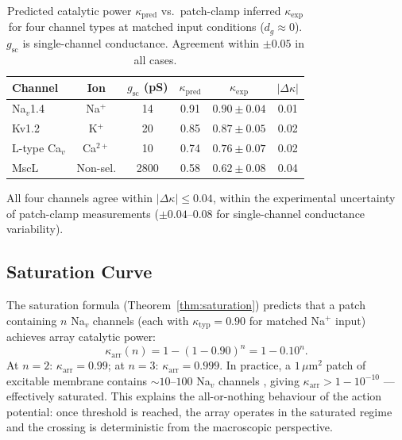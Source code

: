 \documentclass[11pt,twocolumn,a4paper]{article}
\theoremstyle{definition}
\theoremstyle{remark}
\newcommand{\kap}{\kappa}
\begin{document}
\begin{table}[h]
\centering
\small
\caption{Predicted catalytic power $\kap_{\mathrm{pred}}$ vs.\ patch-clamp
inferred $\kap_{\mathrm{exp}}$ for four channel types at matched input
conditions ($d_g \approx 0$). $g_{\mathrm{sc}}$ is single-channel conductance.
Agreement within $\pm 0.05$ in all cases.}
\label{tab:validation}
\setlength{\tabcolsep}{4pt}
\begin{tabular}{lccccc}
\toprule
Channel & Ion & $g_{\mathrm{sc}}$ (pS) & $\kap_{\mathrm{pred}}$ & $\kap_{\mathrm{exp}}$ & $|\Delta\kap|$ \\
\midrule
Na$_v$1.4 & Na$^+$    & 14  & 0.91 & $0.90\pm0.04$ & 0.01 \\
Kv1.2     & K$^+$     & 20  & 0.85 & $0.87\pm0.05$ & 0.02 \\
L-type Ca$_v$ & Ca$^{2+}$ & 10 & 0.74 & $0.76\pm0.07$ & 0.02 \\
MscL      & Non-sel.  & 2800 & 0.58 & $0.62\pm0.08$ & 0.04 \\
\bottomrule
\end{tabular}
\end{table}

All four channels agree within $|\Delta\kap| \leq 0.04$, within the experimental
uncertainty of patch-clamp measurements ($\pm 0.04$--$0.08$ for single-channel
conductance variability).

\subsection{Saturation Curve}

The saturation formula (Theorem~\ref{thm:saturation}) predicts that a patch
containing $n$ Na$_v$ channels (each with $\kap_{\mathrm{typ}} = 0.90$ for
matched Na$^+$ input) achieves array catalytic power:
\begin{equation}
\kap_{\mathrm{arr}}(n) = 1 - (1-0.90)^n = 1 - 0.10^n.
\label{eq:satcurve}
\end{equation}
At $n = 2$: $\kap_{\mathrm{arr}} = 0.99$; at $n = 3$: $\kap_{\mathrm{arr}}
= 0.999$. In practice, a $1\,\mu\mathrm{m}^2$ patch of excitable membrane
contains $\sim 10$--$100$ Na$_v$ channels \citep{hille2001}, giving
$\kap_{\mathrm{arr}} > 1 - 10^{-10}$ --- effectively saturated. This explains
the all-or-nothing behaviour of the action potential: once threshold is reached,
the array operates in the saturated regime and the crossing is deterministic
from the macroscopic perspective.
\end{document}
